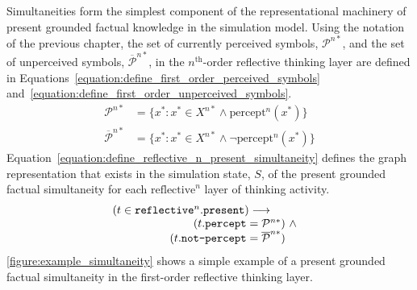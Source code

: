 Simultaneities form the simplest component of the representational
machinery of present grounded factual knowledge in the simulation
model.  Using the notation of the previous chapter, the set of
currently perceived symbols, $\mathcal{P}^{n*}$, and the set of
unperceived symbols, $\overline{\mathcal{P}}^{n*}$, in the
$n^{\text{th}}$-order reflective thinking layer are defined in
{\mbox{Equations~\ref{equation:define_first_order_perceived_symbols}}}
{\mbox{and~\ref{equation:define_first_order_unperceived_symbols}}}.
\begin{align}
\label{equation:define_first_order_perceived_symbols}
           \mathcal{P}^{n*} &= \{x^* : x^* \in X^{n*} \wedge \text{percept}^n(x^*)\} \\
\label{equation:define_first_order_unperceived_symbols}
\overline{\mathcal{P}}^{n*} &= \{x^* : x^* \in X^{n*} \wedge \neg\text{percept}^n(x^*)\}
\end{align}
{\mbox{Equation~\ref{equation:define_reflective_n_present_simultaneity}}}
defines the graph representation that exists in the simulation state,
$S$, of the present grounded factual simultaneity for each
$\text{reflective}^n$ layer of thinking activity.
\begin{equation}
\label{equation:define_reflective_n_present_simultaneity}
\begin{array}{l}
 (t \in \text{\tt{reflective}}^n.\text{\tt{present}}) \longrightarrow \\
\begin{array}{l}
\text{\makebox[4cm][r]{    $(t.\text{\tt{percept}}$}}= \mathcal{P}^{n*}) ~\wedge~ \\
\text{\makebox[4cm][r]{$(t.\text{\tt{not-percept}}$}}= \overline{\mathcal{P}}^{n*})
\end{array}
\end{array}
\end{equation}
{\mbox{\autoref{figure:example_simultaneity}}} shows a simple example
of a present grounded factual simultaneity in the first-order
reflective thinking layer.
